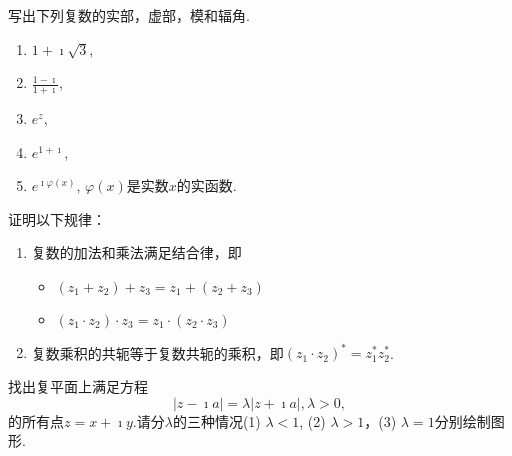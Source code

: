 \documentclass[10pt]{article}
\newenvironment{problem}[2][]{\begin{trivlist}
\item[\hskip \labelsep {\bfseries #1}\hskip \labelsep {\bfseries #2}]}{\end{trivlist}}
\begin{document}
\renewcommand{\labelenumi}{(\arabic{enumi})}
\renewcommand{\labelenumii}{(\arabic{enumi}.\arabic{enumii})}



 

\begin{problem}{1.1}
写出下列复数的实部，虚部，模和辐角.
\begin{enumerate}
  \item $1 + \imath \sqrt{3}$,
  \item $\frac{1-\imath}{1+\imath}$,
  \item $e^{z}$,
  \item $e^{1+\imath}$,
  \item $e^{\imath \varphi(x)}$, $\varphi(x)$是实数$x$的实函数.
\end{enumerate}
\end{problem}


\begin{problem}{1.2}
  证明以下规律：
  \begin{enumerate}
    \item 复数的加法和乘法满足结合律，即 
    \begin{itemize}
      \item $(z_1 + z_2 ) + z_3 = z_1 +( z_2 + z_3)$
      \item $(z_1 \cdot z_2) \cdot z_3 = z_1 \cdot (z_2 \cdot z_3)$
    \end{itemize}

    \item 复数乘积的共轭等于复数共轭的乘积，即$(z_1 \cdot z_2)^* = z_1^* z_2^*$.
  \end{enumerate}  
\end{problem}

\begin{problem}{1.3}
  找出复平面上满足方程\[|z - \imath a|  = \lambda | z + \imath a|, \lambda > 0,\]
  的所有点$z = x + \imath y$.请分$\lambda$的三种情况(1) $\lambda<1$, (2) $\lambda >1$，(3) $\lambda = 1$分别绘制图形.
\end{problem}
\end{document}
